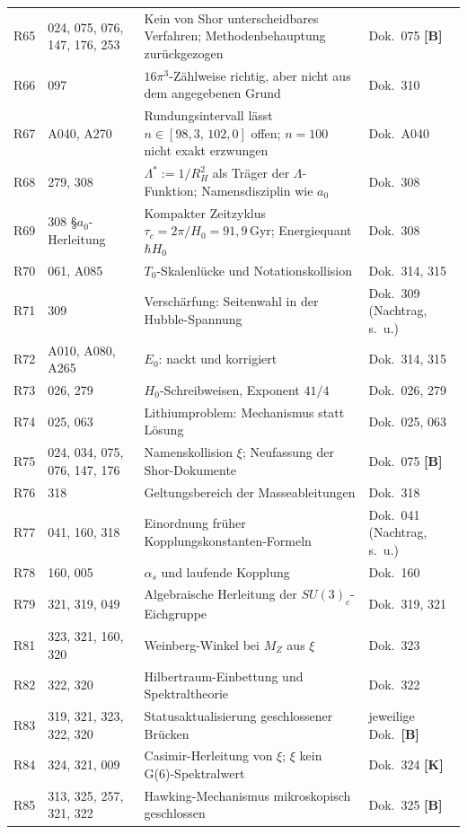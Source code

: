 \begin{longtable}{@{}p{1.2cm}p{3.4cm}p{5.8cm}p{3.4cm}@{}}
R65 & 024, 075, 076, 147, 176, 253 & Kein von Shor unterscheidbares Verfahren; Methodenbehauptung zurückgezogen & Dok.~075 \textbf{[B]} \\
R66 & 097 & $16\pi^3$-Zählweise richtig, aber nicht aus dem angegebenen Grund & Dok.~310 \\
R67 & A040, A270 & Rundungsintervall lässt $n\in[98{,}3,\,102{,}0]$ offen; $n=100$ nicht exakt erzwungen & Dok.~A040 \\
R68 & 279, 308 & $\Lambda^{*}:=1/R_H^2$ als Träger der $\Lambda$-Funktion; Namensdisziplin wie $a_0$ & Dok.~308 \\
R69 & 308 \S$a_0$-Herleitung & Kompakter Zeitzyklus $\tau_c=2\pi/H_0=91{,}9$\,Gyr; Energiequant $\hbar H_0$ & Dok.~308 \\
R70 & 061, A085 & $T_0$-Skalenlücke und Notationskollision & Dok.~314, 315 \\
R71 & 309 & Verschärfung: Seitenwahl in der Hubble-Spannung & Dok.~309 (Nachtrag, s.~u.) \\
R72 & A010, A080, A265 & $E_0$: nackt und korrigiert & Dok.~314, 315 \\
R73 & 026, 279 & $H_0$-Schreibweisen, Exponent $41/4$ & Dok.~026, 279 \\
R74 & 025, 063 & Lithiumproblem: Mechanismus statt Lösung & Dok.~025, 063 \\
R75 & 024, 034, 075, 076, 147, 176 & Namenskollision $\xi$; Neufassung der Shor-Dokumente & Dok.~075 \textbf{[B]} \\
R76 & 318 & Geltungsbereich der Masseableitungen & Dok.~318 \\
R77 & 041, 160, 318 & Einordnung früher Kopplungskonstanten-Formeln & Dok.~041 (Nachtrag, s.~u.) \\
R78 & 160, 005 & $\alpha_s$ und laufende Kopplung & Dok.~160 \\
R79 & 321, 319, 049 & Algebraische Herleitung der $SU(3)_c$-Eichgruppe & Dok.~319, 321 \\
R81 & 323, 321, 160, 320 & Weinberg-Winkel bei $M_Z$ aus $\xi$ & Dok.~323 \\
R82 & 322, 320 & Hilbertraum-Einbettung und Spektraltheorie & Dok.~322 \\
R83 & 319, 321, 323, 322, 320 & Statusaktualisierung geschlossener Brücken & jeweilige Dok.~\textbf{[B]} \\
R84 & 324, 321, 009 & Casimir-Herleitung von $\xi$; $\xi$ kein G(6)-Spektralwert & Dok.~324 \textbf{[K]} \\
R85 & 313, 325, 257, 321, 322 & Hawking-Mechanismus mikroskopisch geschlossen & Dok.~325 \textbf{[B]} \\

\end{longtable}
